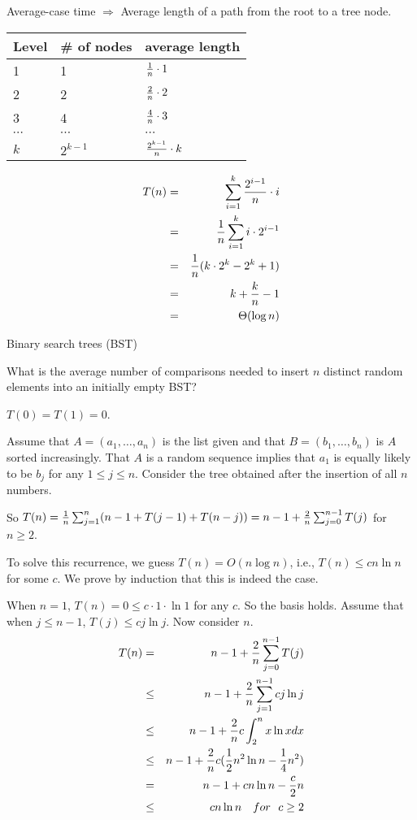 Average-case time $\Rightarrow$ Average length of a path from the root to
a tree node.

\begin{center}
\begin{tabular}{l|l|l}
Level & \# of nodes & average length\\ \hline
1 & 1 & ${1\over n}\cdot 1$\\
2 & 2 & ${2\over n}\cdot 2$\\
3 & 4 & ${4\over n}\cdot 3$\\
$\cdots$ & $\cdots$ & $\cdots$\\
$k$ & $2^{k-1}$ & ${2^{k-1}\over n}\cdot k$
\end{tabular}
\end{center}

\begin{eqnarray*}
T(n)&=&\sum_{i=1}^k {2^{i-1}\over n}\cdot i\\
&=&{1\over n}\sum_{i=1}^k i\cdot 2^{i-1}\\
&=&{1\over n}(k\cdot 2^k-2^k+1)\\
&=&k+{k\over n}-1\\
&=&\Theta(\log n)
\end{eqnarray*}


Binary search trees (BST)

What is the average number of comparisons needed to insert $n$
distinct random elements into an initially empty BST?

$T(0)=T(1)=0$.

Assume that $A=(a_1,\ldots,a_n)$ is the list given and that 
$B=(b_1,\ldots,b_n)$ is $A$ sorted increasingly.
That $A$ is a random sequence implies that $a_1$ is equally likely
to be $b_j$ for any $1\le j\le n$. Consider the tree obtained after
the insertion of all $n$ numbers.

So $T(n)={1\over n}\sum_{j=1}^n(n-1+T(j-1)+T(n-j))=n-1+{2\over n}
\sum_{j=0}^{n-1}T(j)$ for $n\ge2$.

To solve this recurrence, we guess $T(n)=O(n\log n)$, i.e., 
$T(n)\le cn\ln n$ for some $c$. We prove by induction that
this is indeed the case.

When $n=1$, $T(n)=0\le c\cdot 1\cdot \ln 1$ for any $c$. So the
basis holds. Assume that when $j\le n-1$, $T(j)\le cj\ln j$.
Now consider $n$.
\begin{eqnarray*}
T(n)&=&n-1+{2\over n}\sum_{j=0}^{n-1}T(j)\\
&\le&n-1+{2\over n}\sum_{j=1}^{n-1}cj\ln j\\
&\le&n-1+{2\over n}c\int_2^n x\ln xdx\\
&\le&n-1+{2\over n}c({1\over2}n^2\ln n-{1\over4}n^2)\\
&=&n-1+cn\ln n-{c\over2}n\\
&\le&cn\ln n { \quad for\ \ } c\ge  2
\end{eqnarray*}



